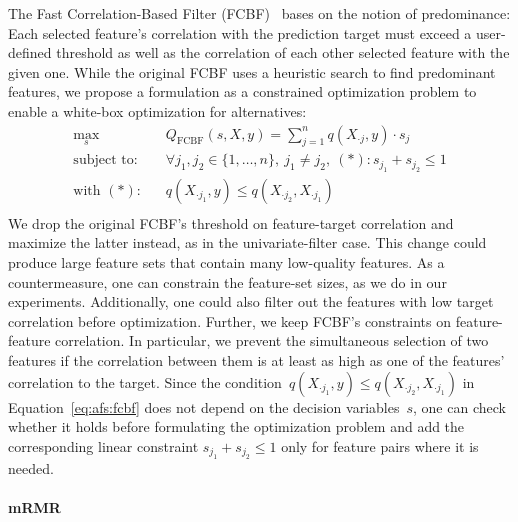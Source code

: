 \documentclass{article}
\theoremstyle{definition}
\begin{document}
The Fast Correlation-Based Filter (FCBF)~\cite{yu2003feature} bases on the notion of predominance:
Each selected feature's correlation with the prediction target must exceed a user-defined threshold as well as the correlation of each other selected feature with the given one.
While the original FCBF uses a heuristic search to find predominant features, we propose a formulation as a constrained optimization problem to enable a white-box optimization for alternatives:
%
\begin{equation}
	\begin{aligned}
		\max_s &\quad Q_{\text{FCBF}}(s,X,y) = \sum_{j=1}^{n} q(X_{\cdot{}j},y) \cdot s_j \\
		\text{subject to:} &\quad \forall j_1, j_2 \in \{1, \dots, n\},~j_1 \neq j_2,~(*): s_{j_1} + s_{j_2} \leq 1 \\
		\text{with } (*) \text{:} &\quad q(X_{\cdot{}j_1},y) \leq q(X_{\cdot{}j_2}, X_{\cdot{}j_1}) \\
	\end{aligned}
	\label{eq:afs:fcbf}
\end{equation}
%
We drop the original FCBF's threshold on feature-target correlation and maximize the latter instead, as in the univariate-filter case.
This change could produce large feature sets that contain many low-quality features.
As a countermeasure, one can constrain the feature-set sizes, as we do in our experiments.
Additionally, one could also filter out the features with low target correlation before optimization.
Further, we keep FCBF's constraints on feature-feature correlation.
In particular, we prevent the simultaneous selection of two features if the correlation between them is at least as high as one of the features' correlation to the target.
Since the condition~$q(X_{\cdot{}j_1},y) \leq q(X_{\cdot{}j_2}, X_{\cdot{}j_1})$ in Equation~\ref{eq:afs:fcbf} does not depend on the decision variables~$s$, one can check whether it holds before formulating the optimization problem and add the corresponding linear constraint $s_{j_1} + s_{j_2} \leq 1$ only for feature pairs where it is needed.

\paragraph{mRMR}
\end{document}
